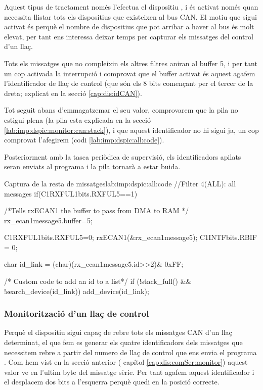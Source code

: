 Aquest tipus de tractament només l'efectua el dispositiu \Monitor, i és activat només quan necessita llistar tots els dispositius que existeixen al bus CAN. El motiu que sigui activat és perquè el nombre de dispositius que pot arribar a haver al bus és molt elevat, per tant ens interessa deixar temps per capturar els missatges del control d'un llaç.

Tots els missatges que no compleixin els altres filtres aniran al buffer 5, i per tant un cop activada la interrupció i comprovat que el buffer activat és aquest agafem l'identificador de llaç de control (que són els 8 bits començant per el tercer de la dreta; explicat en la secció \ref{cap:dis:idCAN}).

Tot seguit abans d'emmagatzemar el seu valor, comprovarem que la pila no estigui plena (la pila esta explicada en la secció \ref{lab:imp:dspic:monitor:can:stack}), i que aquest identificador no hi sigui ja, un cop comprovat l'afegirem (codi \ref{lab:imp:dspic:all:code}).

Posteriorment amb la tasca periòdica de supervisió, els identificadors apilats seran enviats al programa \DCSMonitor i la pila tornarà a estar buida.

\begin{code_c}{Captura de la resta de missatges}{lab:imp:dspic:all:code}
//Filter 4(ALL): all messages
if(C1RXFUL1bits.RXFUL5==1)
{
	/*Tells rxECAN1 the buffer to pass from DMA to RAM */
	rx_ecan1message5.buffer=5;

	C1RXFUL1bits.RXFUL5=0;
	rxECAN1(&rx_ecan1message5);
	C1INTFbits.RBIF = 0;

	char id_link = (char)(rx_ecan1message5.id>>2)& 0xFF;

	/* Custom code to add an id to a list*/
	if (!stack_full() && !search_device(id_link))
		add_device(id_link);
}
\end{code_c}

\subsubsection{Monitorització d'un llaç de control}\label{lab:imp:dspic:monitor:monitoritzacio}

Perquè el dispositiu \Monitor sigui capaç de rebre tots els missatges CAN d'un llaç determinat, el que fem es generar els quatre identificadors dels missatges que necessitem rebre a partir del numero de llaç de control que ens envia el programa \DCSMonitor. Com hem vist en la secció anterior ( capítol \ref{cap:dis:comSer:monitor}) aquest valor ve en l'ultim byte del missatge sèrie. Per tant agafem aquest identificador i el desplacem dos bits a l'esquerra perquè quedi en la posició correcte.


